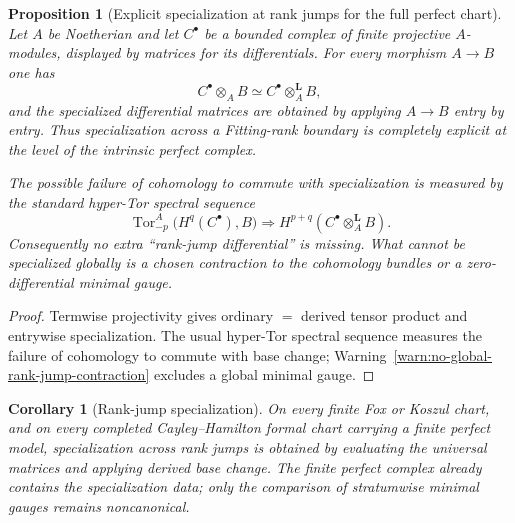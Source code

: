 \documentclass[11pt]{article}
\newtheorem{proposition}[theorem]{Proposition}
\newtheorem{corollary}[theorem]{Corollary}
\theoremstyle{definition}
\begin{document}
\begin{proposition}[Explicit specialization at rank jumps for the full perfect chart]\label{prop:rank-jump-specialization}
Let $A$ be Noetherian and let $C^\bullet$ be a bounded complex of finite projective $A$-modules, displayed by matrices for its differentials.  For every morphism $A\to B$ one has
\begin{equation}\label{eq:rank-jump-derived-specialization}
 C^\bullet\otimes_A B
 \simeq
 C^\bullet\otimes_A^{\mathbf L}B,
\end{equation}
and the specialized differential matrices are obtained by applying $A\to B$ entry by entry.  Thus specialization across a Fitting-rank boundary is completely explicit at the level of the intrinsic perfect complex.

The possible failure of cohomology to commute with specialization is measured by the standard hyper-Tor spectral sequence
\begin{equation}\label{eq:rank-jump-tor-spectral-sequence}
 \operatorname{Tor}^{A}_{-p}
 \bigl(H^q(C^\bullet),B\bigr)
 \Longrightarrow
 H^{p+q}\!\left(C^\bullet\otimes_A^{\mathbf L}B\right).
\end{equation}
Consequently no extra ``rank-jump differential'' is missing.  What cannot be specialized globally is a chosen contraction to the cohomology bundles or a zero-differential minimal gauge.
\end{proposition}

\begin{proof}
Termwise projectivity gives ordinary $=$ derived tensor product and entrywise specialization.  The usual hyper-Tor spectral sequence measures the failure of cohomology to commute with base change; Warning~\ref{warn:no-global-rank-jump-contraction} excludes a global minimal gauge.
\end{proof}

\begin{corollary}[Rank-jump specialization]\label{cor:rank-jump-specialization-solved}
On every finite Fox or Koszul chart, and on every completed Cayley--Hamilton formal chart carrying a finite perfect model, specialization across rank jumps is obtained by evaluating the universal matrices and applying derived base change.  The finite perfect complex already contains the specialization data; only the comparison of stratumwise minimal gauges remains noncanonical.
\end{corollary}
\end{document}
